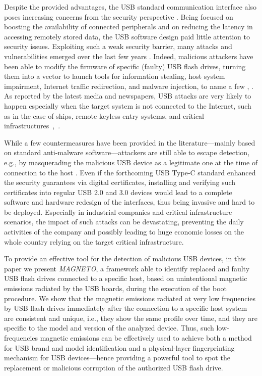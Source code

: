 \documentclass[acmsmall, authorversion]{acmart}
\newcommand{\sol}{\emph{MAGNETO}}
\begin{document}
Despite the provided advantages, the USB standard communication interface also poses increasing concerns from the security perspective \cite{Noyes2016}. Being focused on boosting the availability of connected peripherals and on reducing the latency in accessing remotely stored data, the USB software design paid little attention to security issues. Exploiting such a weak security barrier, many attacks and vulnerabilities emerged over the last few years \cite{Nissim2017}. 
Indeed, malicious attackers have been able to modify the firmware of specific (faulty) USB flash drives, turning them into a vector to launch tools for information stealing, host system impairment, Internet traffic redirection, and malware injection, to name a few \cite{BadUSB}, \cite{Mulliner2012}. As reported by the latest media and newspapers, USB attacks are very likely to happen especially when the target system is not connected to the Internet, such as in the case of ships, remote keyless entry systems, and critical infrastructures~\cite{ships2018},~\cite{ss2019}.

While a few countermeasures have been provided in the literature---mainly based on standard anti-malware software---attackers are still able to escape detection, e.g., by masquerading the malicious USB device as a legitimate one at the time of connection to the host \cite{Tian2016}. Even if the forthcoming USB Type-C standard enhanced the security guarantees via digital certificates, installing and verifying such certificates into regular USB 2.0 and 3.0 devices would lead to a complete software and hardware redesign of the interfaces, thus being invasive and hard to be deployed. Especially in industrial companies and critical infrastructure scenarios, the impact of such attacks can be devastating, preventing the daily activities of the company and possibly leading to huge economic losses on the whole country relying on the target critical infrastructure.

To provide an effective tool for the detection of malicious USB devices, in this paper we present \sol, a framework able to identify replaced and faulty USB flash drives connected to a specific host, based on unintentional magnetic emissions radiated by the USB boards, during the execution of the boot procedure. 
We show that the magnetic emissions radiated at very low frequencies by USB flash drives immediately after the connection to a specific host system are consistent and unique, i.e., they show the same profile over time, and they are specific to the model and version of the analyzed device. 
Thus, such low-frequencies magnetic emissions can be effectively used to achieve both a method for USB brand and model identification and a physical-layer fingerprinting mechanism for USB devices---hence providing a powerful tool to spot the replacement or malicious corruption of the authorized USB flash drive.
\end{document}
